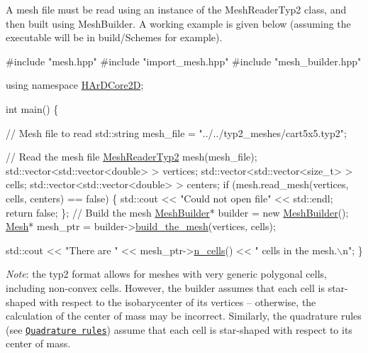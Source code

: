 A mesh file must be read using an instance of the {\ttfamily Mesh\+Reader\+Typ2} class, and then built using {\ttfamily Mesh\+Builder}. A working example is given below (assuming the executable will be in {\ttfamily build/\+Schemes} for example).


\begin{DoxyCode}
\textcolor{preprocessor}{#include "mesh.hpp"}
\textcolor{preprocessor}{#include "import\_mesh.hpp"}
\textcolor{preprocessor}{#include "mesh\_builder.hpp"}

\textcolor{keyword}{using namespace }\hyperlink{namespaceHArDCore2D}{HArDCore2D};

\textcolor{keywordtype}{int} main() \{

    \textcolor{comment}{// Mesh file to read}
    std::string mesh\_file = \textcolor{stringliteral}{"../../typ2\_meshes/cart5x5.typ2"};

    \textcolor{comment}{// Read the mesh file}
    \hyperlink{classHArDCore2D_1_1MeshReaderTyp2}{MeshReaderTyp2} mesh(mesh\_file);
    std::vector<std::vector<double> > vertices;
    std::vector<std::vector<size\_t> > cells;
    std::vector<std::vector<double> > centers;
    \textcolor{keywordflow}{if} (mesh.read\_mesh(vertices, cells, centers) == \textcolor{keyword}{false}) \{
        std::cout << \textcolor{stringliteral}{"Could not open file"} << std::endl;
        \textcolor{keywordflow}{return} \textcolor{keyword}{false};
    \};
    \textcolor{comment}{// Build the mesh}
    \hyperlink{classHArDCore2D_1_1MeshBuilder}{MeshBuilder}* builder = \textcolor{keyword}{new} \hyperlink{classHArDCore2D_1_1MeshBuilder}{MeshBuilder}();
    \hyperlink{classHArDCore2D_1_1Mesh}{Mesh}* mesh\_ptr = builder->\hyperlink{classHArDCore2D_1_1MeshBuilder_a1c392d732ae962e5355786ff04d19024}{build\_the\_mesh}(vertices, cells);

    std::cout << \textcolor{stringliteral}{"There are "} << mesh\_ptr->\hyperlink{group__Mesh_ga2202a0715196c41356692d8adcfe3893}{n\_cells}() << \textcolor{stringliteral}{" cells in the mesh.\(\backslash\)n"};
\}
\end{DoxyCode}


{\itshape Note}\+: the {\ttfamily typ2} format allows for meshes with very generic polygonal cells, including non-\/convex cells. However, the builder assumes that each cell is star-\/shaped with respect to the isobarycenter of its vertices -- otherwise, the calculation of the center of mass may be incorrect. Similarly, the quadrature rules (see \href{#quad_rules}{\tt Quadrature rules}) assume that each cell is star-\/shaped with respect to its center of mass.

